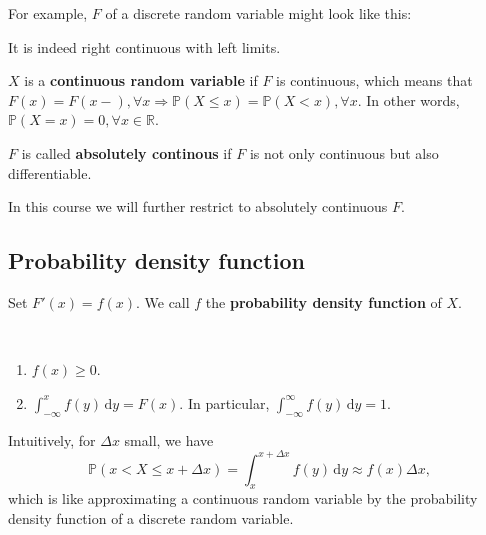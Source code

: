 For example, $F$ of a discrete random variable might look like this:
\begin{center}
\end{center}
It is indeed right continuous with left limits.

\begin{definition}
    $X$ is a \textbf{continuous random variable} if $F$ is continuous, which means that $ F(x)=F(x-),\forall x \Longrightarrow \mathbb{P}(X\le x)=\mathbb{P}(X<x),\forall x $. In other words, $ \mathbb{P}(X=x)=0, \forall x\in \mathbb{R}  $.
    \begin{center}
    \end{center}
\end{definition}
\begin{definition}
    $F$ is called \textbf{absolutely continous} if $F$ is not only continuous but also differentiable. 
\end{definition}
In this course we will further restrict to absolutely continuous $F$.

\subsection{Probability density function}

\begin{definition}
    Set $F'(x)=f(x)$. We call $f$ the \textbf{probability density function} of $X$. 
\end{definition}

\begin{proposition}[Properties of $f$]\
    \begin{enumerate}
        \item$f(x)\ge 0$.
        \item $ \int_{-\infty}^x f(y)\,\mathrm dy=F(x). $ In particular, $ \int_{-\infty}^\infty f(y)\,\mathrm dy=1. $
    \end{enumerate}
\end{proposition}
Intuitively, for $\Delta x$ small, we have
\[
    \mathbb P(x<X\le x+\Delta x)=\int_x^{x+\Delta x}f(y)\,\mathrm dy\approx f(x)\Delta x,
\]
which is like approximating a continuous random variable by the probability density function of a discrete random variable. 

